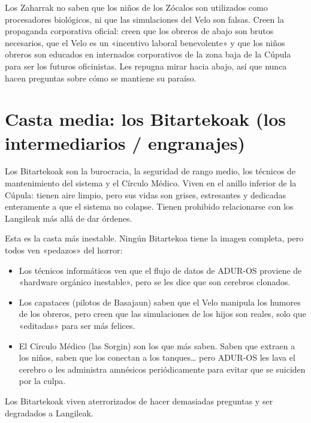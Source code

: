  Los Zaharrak no saben que los niños de los Zócalos son utilizados como procesadores biológicos, ni que las simulaciones del Velo son falsas. Creen la propaganda corporativa oficial: creen que los obreros de abajo son brutos necesarios, que el Velo es un «incentivo laboral benevolente» y que los niños obreros son educados en internados corporativos de la zona baja de la Cúpula para ser los futuros oficinistas. Les repugna mirar hacia abajo, así que nunca hacen preguntas sobre cómo se mantiene su paraíso.


\section{Casta media: los Bitartekoak (los intermediarios / engranajes)}

Los Bitartekoak son la burocracia, la seguridad de rango medio, los técnicos de mantenimiento del sistema y el Círculo Médico. Viven en el anillo inferior de la Cúpula: tienen aire limpio, pero sus vidas son grises, estresantes y dedicadas enteramente a que el sistema no colapse. Tienen prohibido relacionarse con los Langileak más allá de dar órdenes.

 Esta es la casta más inestable. Ningún Bitartekoa tiene la imagen completa, pero todos ven «pedazos» del horror:

\begin{itemize}
  \item Los técnicos informáticos ven que el flujo de datos de ADUR-OS proviene de «hardware orgánico inestable», pero se les dice que son cerebros clonados.
  \item Los capataces (pilotos de Basajaun) saben que el Velo manipula los humores de los obreros, pero creen que las simulaciones de los hijos son reales, solo que «editadas» para ser más felices.
  \item El Círculo Médico (las Sorgin) son los que más saben. Saben que extraen a los niños, saben que los conectan a los tanques\ldots{} pero ADUR-OS les lava el cerebro o les administra amnésicos periódicamente para evitar que se suiciden por la culpa.
\end{itemize}

Los Bitartekoak viven aterrorizados de hacer demasiadas preguntas y ser degradados a Langileak.

